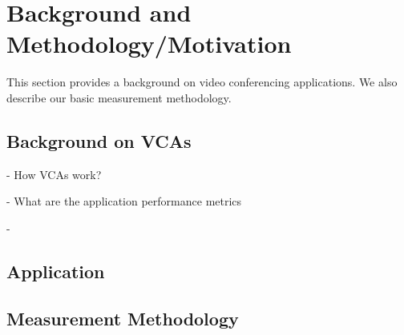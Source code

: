 \section{Background and Methodology/Motivation}
\label{sec:background}
This section provides a background on video conferencing applications. We also describe our basic measurement methodology.

\subsection{Background on VCAs}
- How VCAs work?

- What are the application performance metrics 

- 


\subsection{Application }

\subsection{Measurement Methodology}
  
